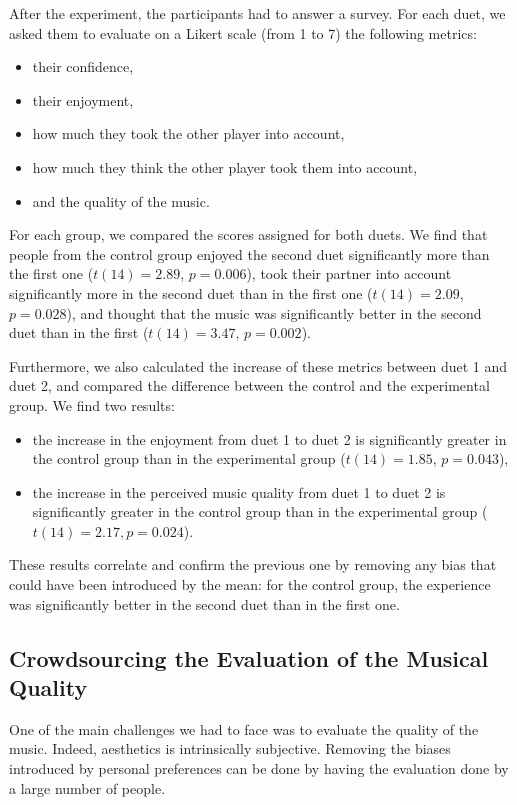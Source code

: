 \documentclass{article}
\begin{document}
After the experiment, the participants had to answer a survey. For each duet, we asked them to evaluate on a Likert scale (from 1 to 7) the following metrics:
\begin{itemize}
\item their confidence,
\item their enjoyment,
\item how much they took the other player into account,
\item how much they think the other player took them into account,
\item and the quality of the music.
\end{itemize}
For each group, we compared the scores assigned for both duets. We find that people from the control group enjoyed the second duet significantly more than the first one ($t(14) = 2.89$, $p = 0.006$), took their partner into account significantly more in the second duet than in the first one ($t(14) = 2.09$, $p = 0.028$), and thought that the music was significantly better in the second duet than in the first ($t(14) = 3.47$, $p = 0.002$).

Furthermore, we also calculated the increase of these metrics between duet 1 and duet 2, and compared the difference between the control and the experimental group. We find two results:
\begin{itemize}
\item the increase in the enjoyment from duet 1 to duet 2 is significantly greater in the control group than in the experimental group ($t(14) = 1.85$, $p = 0.043$),
\item the increase in the perceived music quality from duet 1 to duet 2 is significantly greater in the control group than in the experimental group ($t(14) = 2.17, p = 0.024$).
\end{itemize}
These results correlate and confirm the previous one by removing any bias that could have been introduced by the mean: for the control group, the experience was significantly better in the second duet than in the first one.


\subsection{Crowdsourcing the Evaluation of the Musical Quality}

One of the main challenges we had to face was to evaluate the quality of the music. Indeed, aesthetics is intrinsically subjective. Removing the biases introduced by personal preferences can be done by having the evaluation done by a large number of people.
\end{document}
